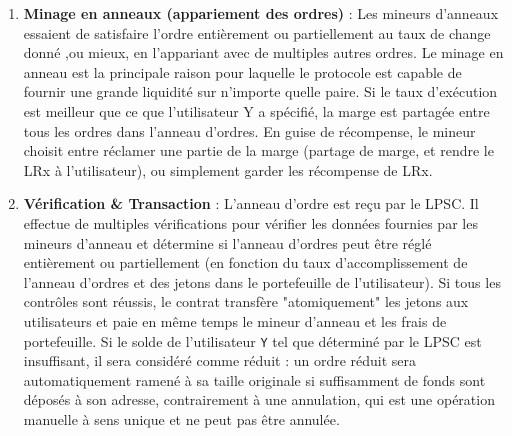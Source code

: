 \documentclass[UTF8,nofonts]{article}
\makeatletter
\newenvironment{figurehere}
 {\def\@captype{figure}}
 {}
\makeatother
\begin{document}
\begin{multicols}{2}
\begin{enumerate}
\begin{center}
\begin{figurehere}

\caption{Processus d'échange Loopring}
\label{fig:process}
\end{figurehere}
\end{center}



\item \textbf{Minage en anneaux (appariement des ordres)} : Les mineurs d’anneaux  essaient de satisfaire l’ordre entièrement ou partiellement au taux de change donné ,ou mieux, en l'appariant avec de multiples autres ordres. Le minage en anneau est la principale raison pour laquelle le protocole est capable de fournir une grande liquidité sur n'importe quelle paire. Si le taux d'exécution est meilleur que ce que l'utilisateur Y a spécifié, la marge est partagée entre tous les ordres dans l’anneau d’ordres. En guise de récompense, le mineur choisit entre réclamer une partie de la marge (partage de marge, et rendre le LRx à l'utilisateur), ou simplement garder les récompense de LRx.

\item \textbf{Vérification \& Transaction} : L'anneau d'ordre est reçu par le LPSC. Il effectue de multiples vérifications pour vérifier les données fournies par les mineurs d’anneau et détermine si l'anneau d’ordres peut être réglé entièrement ou partiellement (en fonction du taux d’accomplissement de l'anneau d’ordres et des jetons dans le portefeuille de l'utilisateur). Si tous les contrôles sont réussis, le contrat transfère "atomiquement" les jetons aux utilisateurs et paie en même temps le mineur d’anneau et les frais de portefeuille. Si le solde de l'utilisateur \verb|Y| tel que déterminé par le LPSC est insuffisant, il sera considéré comme réduit : un ordre réduit sera automatiquement ramené à sa taille originale si suffisamment de fonds sont déposés à son adresse, contrairement à une annulation, qui est une opération manuelle à sens unique et ne peut pas être annulée.

\end{enumerate}





%
%
%


\end{multicols}
\end{document}

